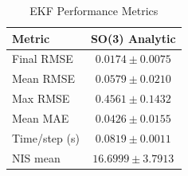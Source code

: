 \begin{table}[htbp]
\centering
\caption{EKF Performance Metrics}
\label{tab:ekf_performance}
\begin{tabular}{lc}
\hline
Metric & SO(3) Analytic \\
\hline
Final RMSE & $0.0174 \pm 0.0075$ \\
Mean RMSE & $0.0579 \pm 0.0210$ \\
Max RMSE & $0.4561 \pm 0.1432$ \\
Mean MAE & $0.0426 \pm 0.0155$ \\
Time/step (s) & $0.0819 \pm 0.0011$ \\
NIS mean & $16.6999 \pm 3.7913$ \\
\hline
\end{tabular}
\end{table}
